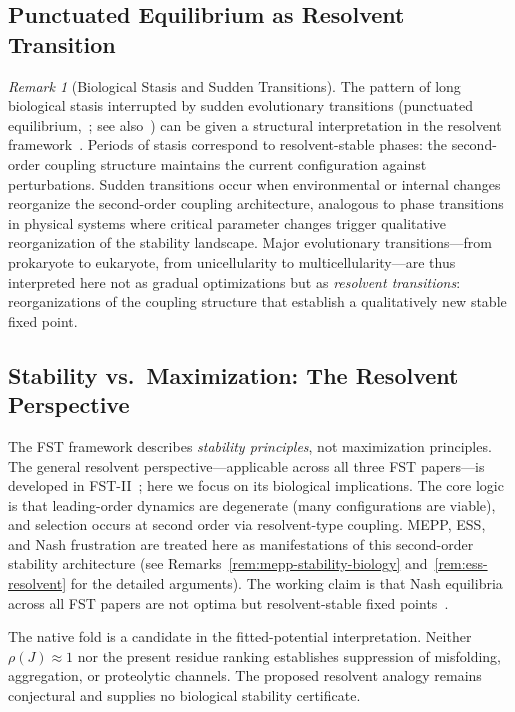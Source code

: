 \documentclass[12pt,a4paper]{article}
\theoremstyle{remark}
\newtheorem{remark}{Remark}
\begin{document}
\subsection{Punctuated Equilibrium as Resolvent Transition}

\begin{remark}[Biological Stasis and Sudden Transitions]
\label{rem:punctuated-equilibrium}
The pattern of long biological stasis interrupted by sudden evolutionary transitions (punctuated equilibrium,~\citealp{GouldEldredge1977}; see also~\citealp{KauffmanOrigins}) can be given a structural interpretation in the resolvent framework~\citep{GeigerRH2026b}. Periods of stasis correspond to resolvent-stable phases: the second-order coupling structure maintains the current configuration against perturbations. Sudden transitions occur when environmental or internal changes reorganize the second-order coupling architecture, analogous to phase transitions in physical systems where critical parameter changes trigger qualitative reorganization of the stability landscape. Major evolutionary transitions---from prokaryote to eukaryote, from unicellularity to multicellularity---are thus interpreted here not as gradual optimizations but as \emph{resolvent transitions}: reorganizations of the coupling structure that establish a qualitatively new stable fixed point.
\end{remark}

\subsection{Stability vs.\ Maximization: The Resolvent Perspective}

The FST framework describes \emph{stability principles}, not maximization principles. The general resolvent perspective---applicable across all three FST papers---is developed in FST-II~\citep{FSTII}; here we focus on its biological implications. The core logic is that leading-order dynamics are degenerate (many configurations are viable), and selection occurs at second order via resolvent-type coupling. MEPP, ESS, and Nash frustration are treated here as manifestations of this second-order stability architecture (see Remarks~\ref{rem:mepp-stability-biology} and~\ref{rem:ess-resolvent} for the detailed arguments). The working claim is that Nash equilibria across all FST papers are not optima but resolvent-stable fixed points~\citep{GeigerRH2026b}.

The native fold is a candidate in the fitted-potential interpretation. Neither $\rho(J)\approx1$ nor the present residue ranking establishes suppression of misfolding, aggregation, or proteolytic channels. The proposed resolvent analogy remains conjectural and supplies no biological stability certificate.
\end{document}
